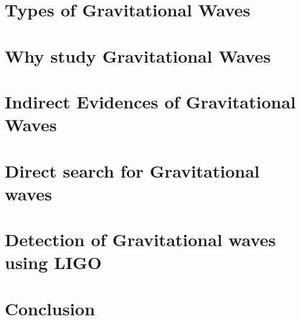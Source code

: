 \documentclass[11pt, a4paper]{article}
\begin{document}
\section{Types of Gravitational Waves}


\section{Why study Gravitational Waves}


\section{Indirect Evidences of Gravitational Waves}


\section{Direct search for Gravitational waves}






\section{Detection of Gravitational waves using LIGO }



\section{Conclusion}




\printbibliography
\end{document}

